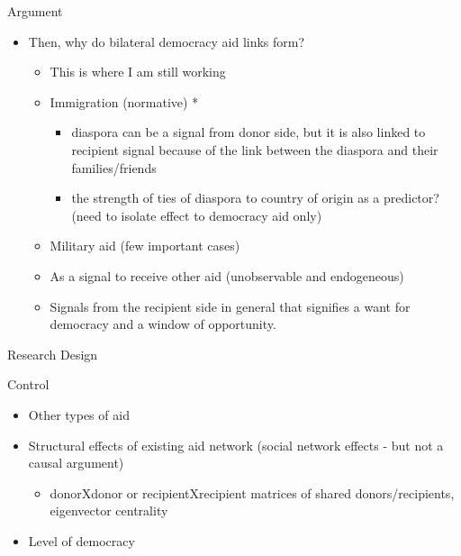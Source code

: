 \documentclass[ignorenonframetext,]{beamer}
\providecommand{\tightlist}{%
  \setlength{\itemsep}{0pt}\setlength{\parskip}{0pt}}
\begin{document}
\begin{frame}{Argument}
\protect\hypertarget{argument-1}{}

\begin{itemize}
\tightlist
\item
  Then, why do bilateral democracy aid links form?

  \begin{itemize}
  \item
    This is where I am still working
  \item
    Immigration (normative) *

    \begin{itemize}
    \tightlist
    \item
      diaspora can be a signal from donor side, but it is also linked to
      recipient signal because of the link between the diaspora and
      their families/friends
    \item
      the strength of ties of diaspora to country of origin as a
      predictor? (need to isolate effect to democracy aid only)
    \end{itemize}
  \item
    Military aid (few important cases)
  \item
    As a signal to receive other aid (unobservable and endogeneous)
  \item
    Signals from the recipient side in general that signifies a want for
    democracy and a window of opportunity.
  \end{itemize}
\end{itemize}

\end{frame}

\begin{frame}{Research Design}
\protect\hypertarget{research-design}{}

\end{frame}

\begin{frame}{Control}
\protect\hypertarget{control}{}

\begin{itemize}
\item
  Other types of aid
\item
  Structural effects of existing aid network (social network effects -
  but not a causal argument)

  \begin{itemize}
  \tightlist
  \item
    donorXdonor or recipientXrecipient matrices of shared
    donors/recipients, eigenvector centrality
  \end{itemize}
\item
  Level of democracy
\end{itemize}

\end{frame}
\end{document}
